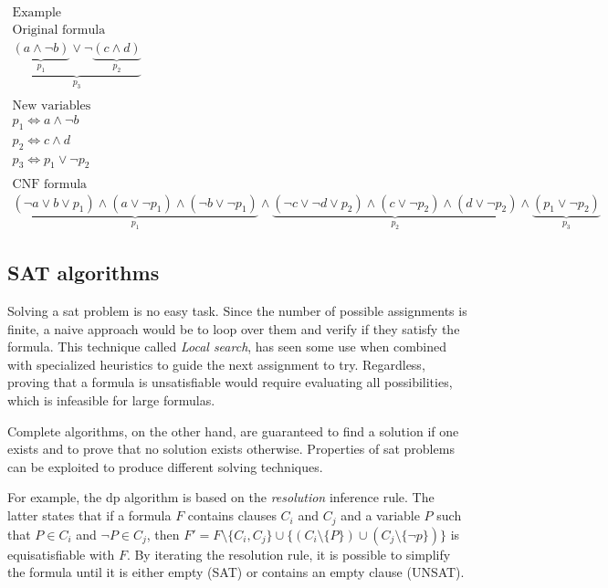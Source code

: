 \begin{multline*}
    \text{Example} \\
    \text{Original formula} \\
    \underbrace{\underbrace{(a \land \neg b)}_{p_1} \lor \neg \underbrace{(c \land d)}_{p_2}}_{p_3} \\
    \\
    \text{New variables} \\
    p_1 \iff a \land \neg b \\
    p_2 \iff c \land d \\
    p_3 \iff p_1 \lor \neg p_2 \\
    \\
    \text{CNF formula} \\
    \underbrace{(\neg a \lor b \lor p_1) \land (a \lor \neg p_1) \land (\neg b \lor \neg p_1)}_{p_1} \land \underbrace{(\neg c \lor \neg d \lor p_2) \land (c \lor \neg p_2) \land (d \lor \neg p_2)}_{p_2} \land \underbrace{(p_1 \lor \neg p_2)}_{p_3}
\end{multline*}

\subsection*{SAT algorithms}

Solving a \gls{sat} problem is no easy task.
Since the number of possible assignments is finite, a naive approach would be to loop over them and verify if they satisfy the formula.
This technique called \textit{Local search}, has seen some use when combined with specialized heuristics to guide the next assignment to try.
Regardless, proving that a formula is unsatisfiable would require evaluating all possibilities, which is infeasible for large formulas.

Complete algorithms, on the other hand, are guaranteed to find a solution if one exists and to prove that no solution exists otherwise.
Properties of \gls{sat} problems can be exploited to produce different solving techniques.

For example, the \gls{dp} algorithm is based on the \textit{resolution} inference rule.
The latter states that if a formula $F$ contains clauses $C_i$ and $C_j$ and a variable $P$ such that $P \in C_i$ and $\neg P \in C_j$, then $F' = F \setminus \{ C_i, C_j \} \cup \{(C_i \setminus \{ P \}) \cup (C_j \setminus \{\neg p\})\}$ is equisatisfiable with $F$.
By iterating the resolution rule, it is possible to simplify the formula until it is either empty (SAT) or contains an empty clause (UNSAT).

